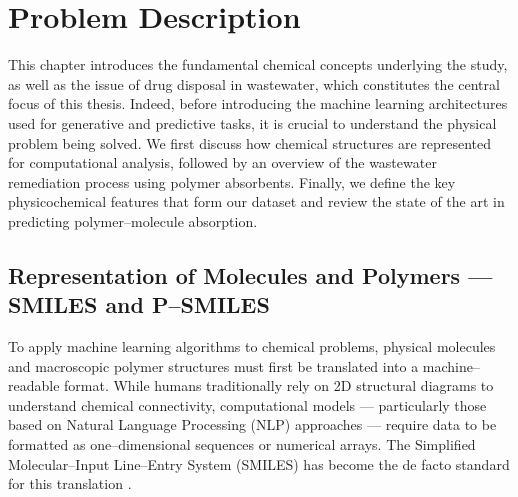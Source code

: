 \chapter{Problem Description}
\label{chap1}

This chapter introduces the fundamental chemical concepts underlying the study, as well as the issue of drug disposal in wastewater, which constitutes the central focus of this thesis. Indeed, before introducing the machine learning architectures used for generative and predictive tasks, it is crucial to understand the physical problem being solved. We first discuss how chemical structures are represented for computational analysis, followed by an overview of the wastewater remediation process using polymer absorbents. Finally, we define the key physicochemical features that form our dataset and review the state of the art in predicting polymer--molecule absorption.


\section{Representation of Molecules and Polymers --- SMILES and P--SMILES}
\label{sec:smiles_and_psmiles}

To apply machine learning algorithms to chemical problems, physical molecules and macroscopic polymer structures must first be translated into a machine--readable format. While humans traditionally rely on 2D structural diagrams to understand chemical connectivity, computational models — particularly those based on Natural Language Processing (NLP) approaches — require data to be formatted as one--dimensional sequences or numerical arrays. The Simplified Molecular--Input Line--Entry System (SMILES) has become the de facto standard for this translation \cite{weininger1988smiles}.

